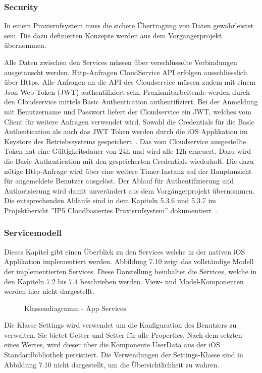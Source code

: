 \subsubsection{Security}

In einem Praxisrufsystem muss die sichere Übertragung von Daten gewährleistet sein.
Die dazu definierten Konzepte werden aus dem Vorgängerprojekt übernommen.

Alle Daten zwischen den Services müssen über verschlüsselte Verbindungen ausgetauscht werden.
Http-Anfragen CloudService API erfolgen ausschliesslich über Https\@.
Alle Anfragen an die API des Cloudservice müssen zudem mit einem Json Web Token (JWT) authentifiziert sein.
Praxismitarbeitende werden durch den Cloudservice mittels Basic Authentication authentifiziert.
Bei der Anmeldung mit Benutzername und Passwort liefert der Cloudservice ein JWT, welches vom Client für weitere Anfragen verwendet wird.
Sowohl die Credentials für die Basic Authentication als auch das JWT Token werden durch die iOS Applikation im Keystore des Betriebssystems gespeichert~\cite{ip5}.
Das vom Cloudservice ausgestellte Token hat eine Gültigkeitsdauer von 24h und wird alle 12h erneuert.
Dazu wird die Basic Authentication mit den gespeicherten Credentials wiederholt.
Die dazu nötige Http-Anfrage wird über eine weitere Timer-Instanz auf der Hauptansicht für angemeldete Benutzer ausgelöst.
Der Ablauf für Authentifizierung und Authorisierung wird damit unverändert aus dem Vorgängerprojekt übernommen.
Die entsprechenden Abläufe sind in dem Kapiteln 5.3.6 und 5.3.7 im Projektbericht ''IP5 Cloudbasiertes Praxisrufsystem'' dokumentiert~\cite{ip5}.

\clearpage

\subsubsection{Servicemodell}

Dieses Kapitel gibt einen Überblick zu den Services welche in der nativen iOS Applikation implementiert werden.
Abbildung 7.10 zeigt das vollständige Modell der implementierten Services.
Diese Darstellung beinhaltet die Services, welche in den Kapiteln 7.2 bis 7.4 beschrieben werden.
View- und Model-Komponenten werden hier nicht dargestellt.

\begin{figure}[h]
    \centering
    \begin{minipage}[b]{1\textwidth}
        \caption{Klassendiagramm - App Services}
    \end{minipage}
\end{figure}

Die Klasse Settings wird verwendet um die Konfiguration des Benutzers zu verwalten.
Sie bietet Getter und Setter für alle Properties.
Nach dem setzten eines Wertes, wird dieser über die Komponente UserData aus der iOS Standardbibliothek persistiert.
Die Verwendungen der Settings-Klasse sind in Abbildung 7.10 nicht dargestellt, um die Übersichtlichkeit zu wahren.

\clearpage
